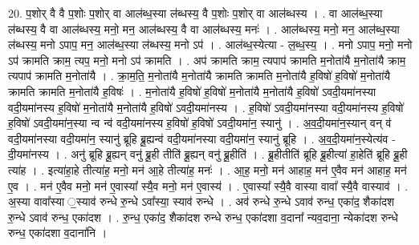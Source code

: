 \documentclass[17pt]{extarticle}
\begin{document}
20. प॒शोर् वै वै प॒शोः प॒शोर् वा आल॑ब्ध॒स्या ल॑ब्धस्य॒ वै प॒शोः प॒शोर् वा आल॑ब्धस्य । . वा आल॑ब्ध॒स्या ल॑ब्धस्य॒ वै वा आल॑ब्धस्य॒ मनो॒ मन॒ आल॑ब्धस्य॒ वै वा आल॑ब्धस्य॒ मनः॑ । . आल॑ब्धस्य॒ मनो॒ मन॒ आल॑ब्ध॒स्या ल॑ब्धस्य॒ मनो ऽपाप॒ मन॒ आल॑ब्ध॒स्या ल॑ब्धस्य॒ मनो ऽप॑ । . आल॑ब्ध॒स्येत्या - ल॒ब्ध॒स्य॒ । . मनो ऽपाप॒ मनो॒ मनो ऽप॑ क्रामति क्राम॒ त्यप॒ मनो॒ मनो ऽप॑ क्रामति । . अप॑ क्रामति क्राम॒ त्यपाप॑ क्रामति म॒नोता॑यै म॒नोता॑यै क्राम॒ त्यपाप॑ क्रामति म॒नोता॑यै । . क्रा॒म॒ति॒ म॒नोता॑यै म॒नोता॑यै क्रामति क्रामति म॒नोता॑यै ह॒विषो॑ ह॒विषो॑ म॒नोता॑यै क्रामति क्रामति म॒नोता॑यै ह॒विषः॑ । . म॒नोता॑यै ह॒विषो॑ ह॒विषो॑ म॒नोता॑यै म॒नोता॑यै ह॒विषो॑ ऽवदी॒यमा॑नस्या वदी॒यमा॑नस्य ह॒विषो॑ म॒नोता॑यै म॒नोता॑यै ह॒विषो॑ ऽवदी॒यमा॑नस्य । . ह॒विषो॑ ऽवदी॒यमा॑नस्या वदी॒यमा॑नस्य ह॒विषो॑ ह॒विषो॑ ऽवदी॒यमा॑न॒स्या न्व न्‍व॑ वदी॒यमा॑नस्य ह॒विषो॑ ह॒विषो॑ ऽवदी॒यमा॑न॒ स्यानु॑ । . अ॒व॒दी॒यमा॑न॒स्यान् वन् व॑ वदी॒यमा॑नस्या वदी॒यमा॑न॒ स्यानु॑ ब्रूहि ब्रू॒ह्यन्व॑ वदी॒यमा॑नस्या वदी॒यमा॑न॒ स्यानु॑ ब्रूहि । . अ॒व॒दी॒यमा॑न॒स्येत्य॑व - दी॒यमा॑नस्य । . अनु॑ ब्रूहि ब्रू॒ह्यन् वनु॑ ब्रू॒ही तीति॑ ब्रू॒ह्यन् वनु॑ ब्रू॒हीति॑ । . ब्रू॒हीतीति॑ ब्रूहि ब्रू॒हीत्या॑ हा॒हेति॑ ब्रूहि ब्रू॒ही त्या॑ह । . इत्या॑हा॒हे तीत्या॑ह॒ मनो॒ मन॑ आ॒हे तीत्या॑ह॒ मनः॑ । . आ॒ह॒ मनो॒ मन॑ आहाह॒ मन॑ ए॒वैव मन॑ आहाह॒ मन॑ ए॒व । . मन॑ ए॒वैव मनो॒ मन॑ ए॒वास्या᳚ स्यै॒व मनो॒ मन॑ ए॒वास्य॑ । . ए॒वास्या᳚ स्यै॒वै वास्या वावा᳚ स्यै॒वै वास्याव॑ । . अ॒स्या वावा᳚स्या ॒स्याव॑ रुन्धे रु॒न्धे ऽवा᳚स्या॒ स्याव॑ रुन्धे । . अव॑ रुन्धे रु॒न्धे ऽवाव॑ रुन्ध॒ एका॑द॒ शैका॑दश रु॒न्धे ऽवाव॑ रुन्ध॒ एका॑दश । . रु॒न्ध॒ एका॑द॒ शैका॑दश रुन्धे रुन्ध॒ एका॑दशा व॒दाना᳚ न्यव॒दाना॒ न्येका॑दश रुन्धे रुन्ध॒ एका॑दशा व॒दाना॑नि । \newline
\end{document}
